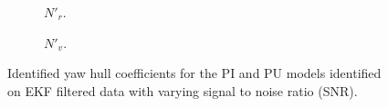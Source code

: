 \begin{figure}
    \centering
    \begin{subfigure}[b]{0.49\textwidth}
        \centering
        
        \caption{${N}'_r$.}
        \label{fig:SNR_sensitivity.Nr}
    \end{subfigure}
    \vfill
    \begin{subfigure}[b]{0.49\textwidth}
        \centering
        
        \caption{${N}'_v$.}
        \label{fig:SNR_sensitivity.Nv}
    \end{subfigure}
    
    \caption{Identified yaw hull coefficients for the PI and PU models identified on EKF filtered
data with varying signal to noise ratio (SNR).}
    \label{fig:SNR}
\end{figure}